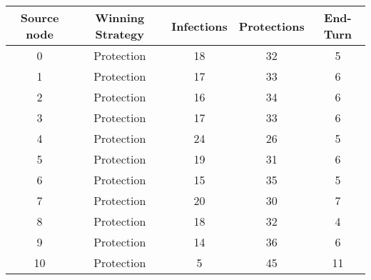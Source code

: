 \documentclass[results.tex]{subfiles}
\begin{document}
    \begin{center}
        \begin{tabular}{| c || c | c | c | c |}
            \hline
            {\bfseries Source node} & {\bfseries Winning Strategy} & {\bfseries Infections} & {\bfseries Protections}
            & {\bfseries End-Turn}
            \\  %
            \hline\hline
            0                       & Protection                   & 18                     & 32                      & 5                    \\
            \hline
            1                       & Protection                   & 17                     & 33                      & 6                    \\
            \hline
            2                       & Protection                   & 16                     & 34                      & 6                    \\
            \hline
            3                       & Protection                   & 17                     & 33                      & 6                    \\
            \hline
            4                       & Protection                   & 24                     & 26                      & 5                    \\
            \hline
            5                       & Protection                   & 19                     & 31                      & 6                    \\
            \hline
            6                       & Protection                   & 15                     & 35                      & 5                    \\
            \hline
            7                       & Protection                   & 20                     & 30                      & 7                    \\
            \hline
            8                       & Protection                   & 18                     & 32                      & 4                    \\
            \hline
            9                       & Protection                   & 14                     & 36                      & 6                    \\
            \hline
            10                      & Protection                   & 5                      & 45                      & 11                   \\

\end{tabular}
\end{center}
\end{document}
